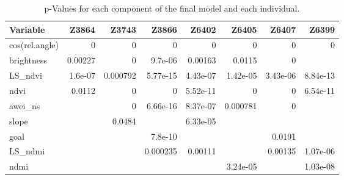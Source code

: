 \begin{table}[H]
\centering
\caption[p-Values for each variable and each individual]{p-Values for each component of the final model and each individual.} 
\label{table:summary_pvalue_BWA}
\begin{tabular}{lrrrrrrr}
  \hline
Variable & Z3864 & Z3743 & Z3866 & Z6402 & Z6405 & Z6407 & Z6399 \\ 
  \hline
cos(rel.angle) &    0 &    0 &    0 &    0 &    0 &    0 &    0 \\ 
  brightness & 0.00227 &    0 & 9.7e-06 & 0.00163 & 0.0115 &    0 &  \\ 
  LS\_ndvi & 1.6e-07 & 0.000792 & 5.77e-15 & 4.43e-07 & 1.42e-05 & 3.43e-06 & 8.84e-13 \\ 
  ndvi & 0.0112 &    0 &    0 & 5.52e-11 &    0 &    0 & 6.54e-11 \\ 
  awei\_ns &  &    0 & 6.66e-16 & 8.37e-07 & 0.000781 &    0 &  \\ 
  slope &  & 0.0484 &  & 6.33e-05 &  &  &  \\ 
  goal &  &  & 7.8e-10 &  &  & 0.0191 &  \\ 
  LS\_ndmi &  &  & 0.000235 & 0.00111 &  & 0.00135 & 1.07e-06 \\ 
  ndmi &  &  &  &  & 3.24e-05 &  & 1.03e-08 \\ 
   \hline
\end{tabular}
\end{table}
